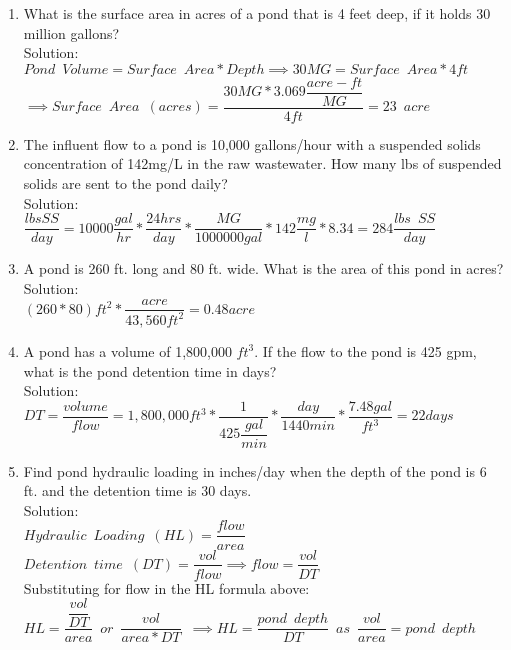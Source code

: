\documentclass{article}
\begin{document}
\begin{enumerate}

\item What is the surface area in acres of a pond that is 4 feet deep, if it holds 30 million gallons?\\

Solution:\\
$Pond \enspace Volume= Surface \enspace Area*Depth \implies 30MG=Surface \enspace Area*4ft$\\
$ \implies Surface \enspace Area \enspace (acres)=\dfrac{30MG*3.069\dfrac{acre-ft}{MG}}{4ft}=\boxed{23 \enspace acre}$


\item The influent flow to a pond is 10,000 gallons/hour with a suspended solids concentration of 142mg/L in the raw wastewater.  How many lbs of suspended solids are sent to the pond daily?
\\
Solution:\\
$\dfrac{lbs SS}{day}=10000\dfrac{gal}{hr}*\dfrac{24hrs}{day}*\dfrac{MG}{1000000gal}*142\dfrac{mg}{l}*8.34=\boxed{284\dfrac{lbs \enspace SS}{day}}$


\item A pond is 260 ft. long and 80 ft. wide. What is the area of this pond in acres?\\ 
Solution:\\
$(260*80)ft^2*\dfrac{acre}{43,560ft^2}=\boxed{0.48acre}$

\item A pond has a volume of 1,800,000 $ft^3$. If the flow to the pond is 425 gpm, what is the pond detention time in days?
\\
Solution:\\
$DT=\dfrac{volume}{flow}=1,800,000ft^3*\dfrac{1}{425\dfrac{gal}{min}}*\dfrac{day}{1440min}*\dfrac{7.48gal}{ft^3}=\boxed{22days}$

\item Find pond hydraulic loading in inches/day when the depth of the pond is 6 ft. and the detention time is 30 days.\\
Solution:\\

$Hydraulic \enspace Loading \enspace (HL)=\dfrac{flow}{area}$\\
$Detention \enspace time \enspace (DT)=\dfrac{vol}{flow} \implies flow=\dfrac{vol}{DT} $\\
Substituting \enspace for \enspace flow \enspace in \enspace the HL \enspace formula above:\\
$HL=\dfrac{\dfrac{vol}{DT}}{area}\enspace or \enspace \dfrac{vol}{area*DT} \enspace \implies \boxed{HL=\dfrac{pond \enspace depth}{DT}} \enspace as \enspace \dfrac{vol}{area}=pond \enspace depth$\\


\end{enumerate}
\end{document}

